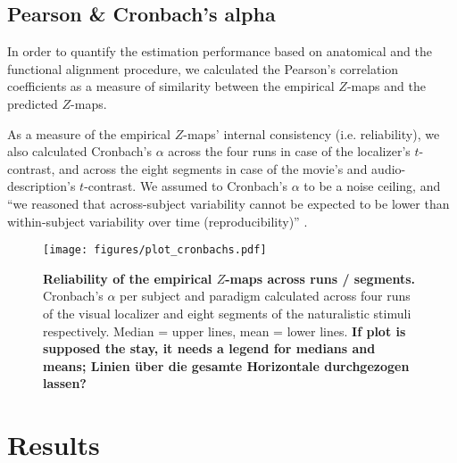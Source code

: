 \subsection{Pearson \& Cronbach's alpha}



In order to quantify the estimation performance based on anatomical and the
functional alignment procedure, we calculated the Pearson's correlation
coefficients as a measure of similarity between the empirical $Z$-maps and the
predicted $Z$-maps.

As a measure of the empirical $Z$-maps' internal consistency (i.e.
reliability), we also calculated Cronbach's $\alpha$ across the four runs in
case of the localizer's $t$-contrast, and across the eight segments in case of
the movie's and audio-description's $t$-contrast.
%
We assumed to Cronbach's $\alpha$ to be a noise ceiling, and ``we reasoned that
across-subject variability cannot be expected to be lower than within-subject
variability over time (reproducibility)'' \citep{rosenke2021probabilistic}.


\begin{figure*}[tbp] \centering
    \texttt{[image: figures/plot\_cronbachs.pdf]}
    \caption{
    \textbf{Reliability of the empirical $Z$-maps across runs / segments.}
    Cronbach's $\alpha$ per subject and paradigm calculated across four runs of
    the visual localizer and eight segments of the naturalistic stimuli
    respectively.
    Median = upper lines, mean = lower lines.
    \textbf{If plot is supposed the stay, it needs a legend for medians
    and means; Linien über die gesamte Horizontale durchgezogen lassen?}
    }
    \label{fig:stripplot}
\end{figure*}


\section{Results}



